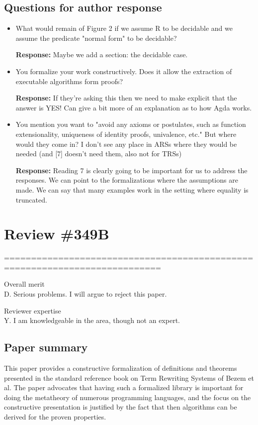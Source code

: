 \documentclass[11pt]{article}
\newcommand{\res}[1]{\par\noindent\textbf{Response:} #1\par}
\begin{document}
\subsection*{Questions for author response}
\begin{itemize}
	\item What would remain of Figure 2 if we assume R to be decidable and we assume the predicate "normal form" to be decidable?
	      \res{Maybe we add a section: the decidable case. }
	\item You formalize your work constructively. Does it allow the extraction of executable algorithms form proofs?
	      \res{If they're asking this then we need to make explicit that the answer is YES! Can give a bit more of an explanation as to how Agda works.}
	\item You mention you want to "avoid any axioms or postulates, such as function extensionality, uniqueness of identity proofs, univalence, etc." But where would they come in? I don't see any place in ARSs where they would be needed (and [7] doesn't need them, also not for TRSs)
	      \res{Reading 7 is clearly going to be important for us to address the responses. We can point to the formalizations where the assumptions are made. We can say that many examples work in the setting where equality is truncated. }
\end{itemize}


\section*{Review \#349B}
===========================================================================

Overall merit
\\
D. Serious problems. I will argue to reject this paper.

Reviewer expertise
\\
Y. I am knowledgeable in the area, though not an expert.

\subsection*{Paper summary}

This paper provides a constructive formalization of definitions and theorems
presented in the standard reference book on Term Rewriting Systems of Bezem et al.
The paper advocates that having such a formalized library is important for doing
the metatheory of numerous programming languages, and the focus on the
constructive presentation is justified by the fact that then algorithms can be
derived for the proven properties.
\end{document}
